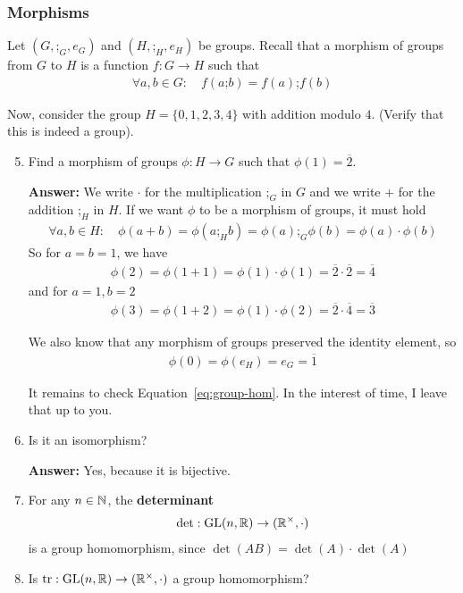 \subsubsection{Morphisms}
Let $(G,\texttt{;}_G,e_G)$ and $(H,\texttt{;}_H,e_H)$ be groups.
Recall that a morphism of groups from $G$ to $H$ is a function $f: G \to H$ such that
\begin{align}
  \label{eq:group-hom}
  \forall a,b \in G\colon \quad
  f(a \texttt{;}b) = f(a) \texttt{;} f(b)
\end{align}


Now, consider the group $H = \{0,1,2,3,4\}$ with addition modulo $4$. (Verify that this is indeed a group).
\begin{enumerate}
  \setcounter{enumi}{4}
  \item Find a morphism of groups $\phi: H \to G$ such that $\phi(1) = \overline{2}$.

    \textbf{Answer:}
    We write $\cdot$ for the multiplication $\texttt{;}_G$ in $G$ and we write $+$ for the addition $\texttt{;}_H$ in $H$. If we want $\phi$ to be a morphism of groups, it must hold 
    \begin{align*}
      \forall a,b\in H\colon \quad
      \phi(a+b) = \phi(a \texttt{;}_H b) = 
      \phi(a) \texttt{;}_G \phi(b)
      =
      \phi(a) \cdot \phi(b)
    \end{align*}
    So for $a = b =1$, we have
    \begin{align*}
      \phi(2) = \phi(1 + 1) = \phi(1) \cdot \phi(1) = \overline{2} \cdot \overline{2} = \overline{4}
    \end{align*}
    and for $a = 1, b = 2$
    \begin{align*}
      \phi(3) = \phi(1 + 2) = \phi(1) \cdot \phi(2) = \overline{2} \cdot \overline{4} = \overline{3}
    \end{align*}

    We also know that any morphism of groups preserved the identity element, so
    \begin{align*}
      \phi(0) =\phi(e_H) = e_G = \overline{1}
    \end{align*}

    It remains to check Equation~\eqref{eq:group-hom}. In the interest of time, I leave that up to you.

  \item Is it an isomorphism? 

    \textbf{Answer:}
    Yes, because it is bijective.

  \item For any $n \in \mathbb{N}$, the \textbf{determinant}
    \begin{align*}
      \det: \operatorname{GL}(n,\mathbb{R}) \to (\mathbb{R}^{\times}, \cdot)
    \end{align*}
    is a group homomorphism, since $\det(AB) = \det(A) \cdot \det(A)$
  \item Is $\operatorname{tr}: \operatorname{GL}(n,\mathbb{R}) \to (\mathbb{R}^{\times},\cdot)$ a group homomorphism?


\end{enumerate}
